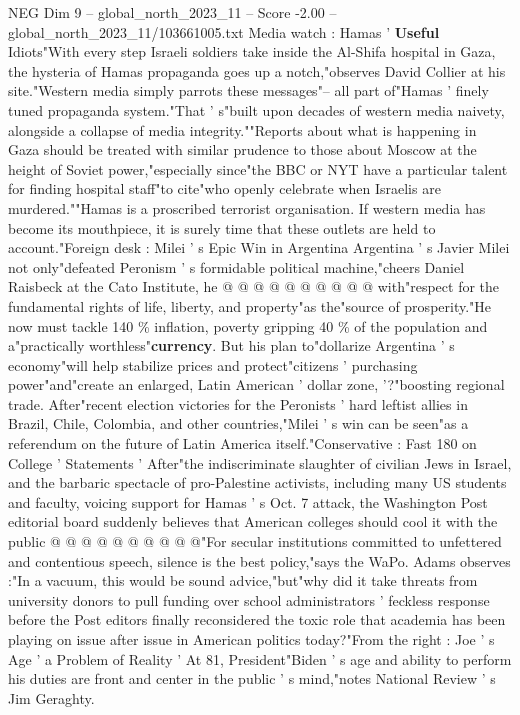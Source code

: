 \begin{textsample}{NEG Dim 9 – global\_north\_2023\_11 – Score -2.00 – global\_north\_2023\_11/103661005.txt}  \label{ex:f9_neg_303}
Media watch : Hamas ' \textbf{Useful} Idiots"With every step Israeli soldiers take inside the Al-Shifa hospital in Gaza, the hysteria of Hamas propaganda goes up a notch,"observes David Collier at his site."Western media simply parrots these messages"-- all part of"Hamas ' finely tuned propaganda system."That ' s"built upon decades of western media naivety, alongside a collapse of media integrity.""Reports about what is happening in Gaza should be treated with similar prudence to those about Moscow at the height of Soviet power,"especially since"the BBC or NYT have a particular talent for finding hospital staff"to cite"who openly celebrate when Israelis are murdered.""Hamas is a proscribed terrorist organisation.
If western media has become its mouthpiece, it is surely time that these outlets are held to account."Foreign desk : Milei ' s Epic Win in Argentina Argentina ' s Javier Milei not only"defeated Peronism ' s formidable political machine,"cheers Daniel Raisbeck at the Cato Institute, he @ @ @ @ @ @ @ @ @ @ with"respect for the fundamental rights of life, liberty, and property"as the"source of prosperity."He now must tackle 140 \% inflation, poverty gripping 40 \% of the population and a"practically worthless"\textbf{currency}.
But his plan to"dollarize Argentina ' s economy"will help stabilize prices and protect"citizens ' purchasing power"and"create an enlarged, Latin American ' dollar zone, '?"boosting regional trade.
After"recent election victories for the Peronists ' hard leftist allies in Brazil, Chile, Colombia, and other countries,"Milei ' s win can be seen"as a referendum on the future of Latin America itself."Conservative : Fast 180 on College ' Statements ' After"the indiscriminate slaughter of civilian Jews in Israel, and the barbaric spectacle of pro-Palestine activists, including many US students and faculty, voicing support for Hamas ' s Oct. 7 attack, the Washington Post editorial board suddenly believes that American colleges should cool it with the public @ @ @ @ @ @ @ @ @ @"For secular institutions committed to unfettered and contentious speech, silence is the best policy,"says the WaPo.
Adams observes :"In a vacuum, this would be sound advice,"but"why did it take threats from university donors to pull funding over school administrators ' feckless response before the Post editors finally reconsidered the toxic role that academia has been playing on issue after issue in American politics today?"From the right : Joe ' s Age ' a Problem of Reality ' At 81, President"Biden ' s age and ability to perform his duties are front and center in the public ' s mind,"notes National Review ' s Jim Geraghty.

\end{textsample}
